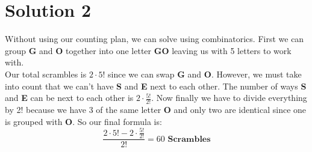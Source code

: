 \documentclass{article}
\begin{document}
\section{Solution 2}
Without using our counting plan, we can solve using combinatorics. First we can group \textbf{G} and \textbf{O} together into one letter \textbf{GO} leaving us with 5 letters to work with. \\Our total scrambles is \(2 \cdot 5!\) since we can swap \textbf{G} and \textbf{O}. However, we must take into count that we can't have \textbf{S} and \textbf{E} next to each other. The number of ways \textbf{S} and \textbf{E} can be next to each other is \(2 \cdot \frac{5!}{2!}\). Now finally we have to divide everything by 2! because we have 3 of the same letter \textbf{O} and only two are identical since one is grouped with \textbf{O}. So our final formula is:
\[\frac{2 \cdot 5! - 2 \cdot \frac{5!}{2!}}{2!} = 60 \textbf{ Scrambles}\]
\end{document}
